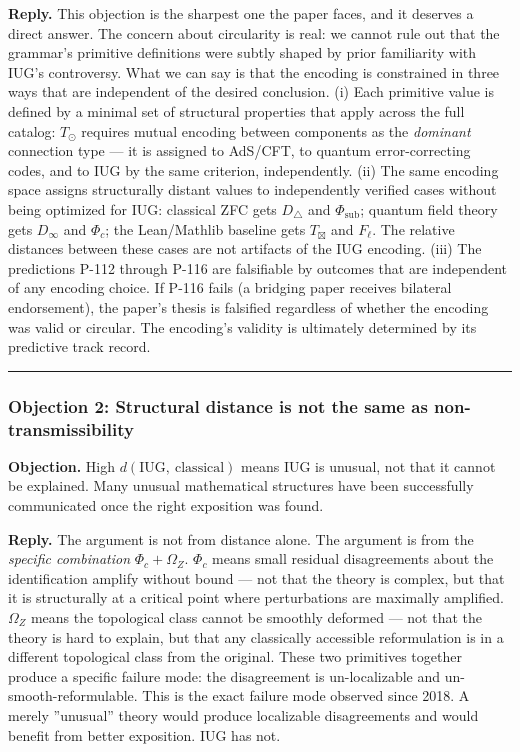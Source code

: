 \documentclass[10pt,a4paper]{article}
\begin{document}
\textbf{Reply.} This objection is the sharpest one the paper faces, and it deserves a direct answer.
The concern about circularity is real: we cannot rule out that the grammar's primitive definitions
were subtly shaped by prior familiarity with IUG's controversy.
What we can say is that the encoding is constrained in three ways that are independent of the
desired conclusion.
(i) Each primitive value is defined by a minimal set of structural properties that apply
across the full catalog: $T_\odot$ requires mutual encoding between components as the
\emph{dominant} connection type --- it is assigned to AdS/CFT, to quantum error-correcting codes,
and to IUG by the same criterion, independently.
(ii) The same encoding space assigns structurally distant values to independently verified cases
without being optimized for IUG: classical ZFC gets $D_{\triangle}$ and $\Phi_\text{sub}$;
quantum field theory gets $D_{\infty}$ and $\Phi_c$; the Lean/Mathlib baseline gets
$T_{\boxtimes}$ and $F_{\ell}$.
The relative distances between these cases are not artifacts of the IUG encoding.
(iii) The predictions P-112 through P-116 are falsifiable by outcomes that are independent
of any encoding choice.
If P-116 fails (a bridging paper receives bilateral endorsement), the paper's thesis is
falsified regardless of whether the encoding was valid or circular.
The encoding's validity is ultimately determined by its predictive track record.

\begin{center}
\rule{0.5\textwidth}{0.4pt}
\end{center}

\subsubsection{Objection 2: Structural distance is not the same as non-transmissibility}

\textbf{Objection.} High $d(\text{IUG},\ \text{classical})$ means IUG is unusual, not that it
cannot be explained. Many unusual mathematical structures have been successfully communicated
once the right exposition was found.

\textbf{Reply.} The argument is not from distance alone. The argument is from the \emph{specific
combination} $\Phi_c + \Omega_Z$. $\Phi_c$ means small residual disagreements about the
identification amplify without bound --- not that the theory is complex, but that it is
structurally at a critical point where perturbations are maximally amplified. $\Omega_Z$
means the topological class cannot be smoothly deformed --- not that the theory is hard to
explain, but that any classically accessible reformulation is in a different topological class
from the original. These two primitives together produce a specific failure mode: the
disagreement is un-localizable and un-smooth-reformulable. This is the exact failure mode
observed since 2018. A merely ''unusual'' theory would produce localizable disagreements and
would benefit from better exposition. IUG has not.
\end{document}
